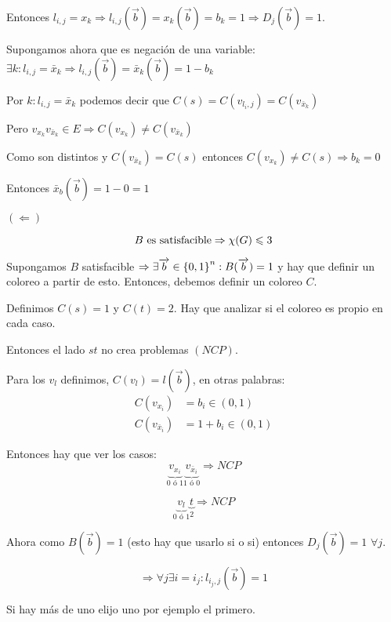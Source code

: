 \documentclass[12pt,a4paper]{article}
\begin{document}
Entonces $l_{i,j} = x_{k} \Rightarrow l_{i,j}(\overrightarrow{b}) = x_{k}(\overrightarrow{b}) = b_{k} = 1 \Rightarrow D_{j}(\overrightarrow{b}) = 1$.
\medskip

Supongamos ahora que es negación de una variable:
$\exists k: l_{i,j} = \bar{x}_{k} \Rightarrow l_{i,j}(\overrightarrow{b}) = \bar{x}_{k}(\overrightarrow{b}) = 1 - b_{k}$

Por $k: l_{i,j} = \bar{x}_{k}$ podemos decir que $C(s) = C(v_{l_{i},j}) = C(v_{\bar{x}_{k}})$
\medskip

Pero $v_{x_{k}}v_{\bar{x}_{k}} \in E \Rightarrow C(v_{x_{k}}) \neq C(v_{\bar{x}_{k}})$
\medskip

Como son distintos y $C(v_{\bar{x}_{k}}) = C(s)$ entonces $C(v_{x_{k}}) \neq C(s) \Rightarrow b_{k} = 0$
\medskip

Entonces $\bar{x}_{b}(\overrightarrow{b}) = 1-0 = 1$

$(\Leftarrow)$ 

$$B \text{ es satisfacible} \Rightarrow \chi(G) \leqslant 3$$

Supongamos $B$ satisfacible $\Rightarrow \exists \overrightarrow{b} \in \left\lbrace 0,1 \right\rbrace^{n} : B(\overrightarrow{b}) = 1$ 
y hay que definir un coloreo a partir de esto. Entonces, debemos definir un coloreo 
$C$.
\medskip

Definimos $C(s) = 1$ y $C(t) =2$. Hay que analizar si el coloreo es propio en cada caso.
\medskip

Entonces el lado $st$ no crea problemas $(NCP)$.
\medskip

Para los $v_{l}$ definimos, $C(v_{l}) = l(\overrightarrow{b})$, en otras palabras:
\begin{align*}
    C(v_{x_{i}}) &= b_{i} \in (0,1) \\
    C(v_{\bar{x}_{i}}) &= 1 + b_{i} \in (0,1)
\end{align*}

Entonces hay que ver los casos:
$$\underbrace{v_{x_{i}}}_{0\,\,\text{ó}\,\,1} \underbrace{v_{\bar{x}_{i}}}_{1\,\,\text{ó}\,\,0} \Rightarrow NCP $$

$$\underbrace{v_{l}}_{0\,\,\text{ó}\,\,1} \underbrace{t}_{2} \Rightarrow NCP $$

Ahora como $B(\overrightarrow{b}) = 1$ (esto hay que usarlo si o si) entonces 
$D_{j}(\overrightarrow{b}) = 1\,\, \forall j$.
\medskip

$$\Rightarrow \forall j \exists i = i_{j} : l_{i_{j},j}(\overrightarrow{b}) = 1$$

Si hay más de uno elijo uno por ejemplo el primero.
\medskip
\end{document}

